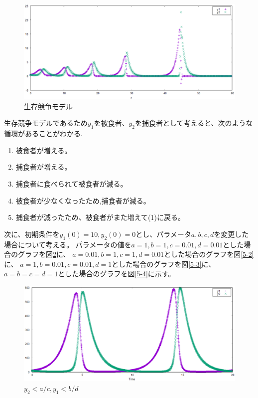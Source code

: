 \begin{figure}[htbp]
\centering
\includegraphics[scale=0.7]{./img/kadai5.eps}
\caption{生存競争モデル}
\label{graph_kadai5}
\end{figure}

生存競争モデルであるため$y_1$を被食者、$y_2$を捕食者として考えると、次のような循環があることがわかる.

\begin{enumerate}
 \item 被食者が増える。
 \item 捕食者が増える。
 \item 捕食者に食べられて被食者が減る。
 \item 被食者が少なくなったため,捕食者が減る。
 \item 捕食者が減ったため、被食者がまた増えて(1)に戻る。
\end{enumerate}

次に、初期条件を$y_1(0)=10,y_2(0)=0$とし、パラメータ$a,b,c,d$を変更した場合について考える。
パラメータの値を$a=1,b=1,c=0.01,d=0.01$とした場合のグラフを図\ref{5-1}に、
$a=0.01,b=1,c=1,d=0.01$とした場合のグラフを図\ref{5-2}に、
$a=1,b=0.01,c=0.01,d=1$とした場合のグラフを図\ref{5-3}に、
$a=b=c=d=1$とした場合のグラフを図\ref{5-4}に示す。

\begin{figure}[htbp]
\centering
\includegraphics[scale=0.5]{./img/kadai5_1.eps}
\caption{$y_2<a/c,y_1<b/d$}
\label{5-1}
\end{figure}

